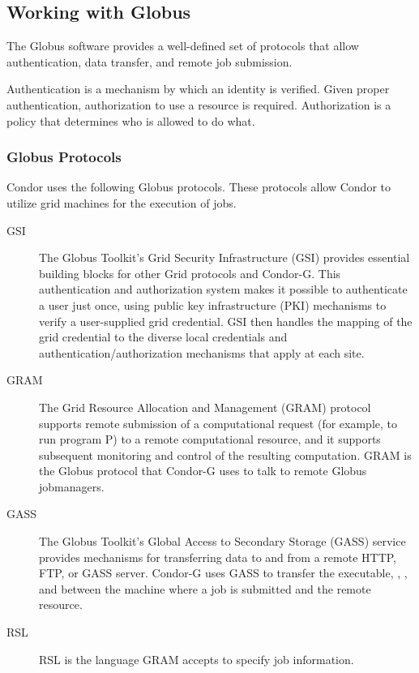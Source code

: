 \subsection{\label{sec:Globus-intro}Working with Globus}

The Globus software provides a well-defined set of protocols
that allow authentication, data transfer, and remote job submission.

Authentication is a mechanism by which an identity is verified.
Given proper authentication, authorization to use a resource
is required.
Authorization is a policy that determines who is allowed to do what. 


\subsubsection{\label{sec:Globus-Protocols}Globus Protocols}
Condor uses the following Globus protocols.
These protocols allow Condor to utilize grid machines for
the execution of jobs.
\begin{description}
\item[GSI]
The Globus Toolkit's Grid Security Infrastructure (GSI) provides essential
building blocks for other Grid protocols and Condor-G.
This authentication and authorization system
makes it possible to authenticate a user just once,
using public key infrastructure (PKI) mechanisms to verify
a user-supplied grid credential.
GSI then handles the mapping of the grid credential to the
diverse local credentials and authentication/authorization mechanisms that
apply at each site. 
\item[GRAM]
The Grid Resource Allocation and Management (GRAM) protocol supports remote
submission of a computational request (for example, to run program P)
to a remote computational resource,
and it supports subsequent monitoring and control of the resulting
computation. 
GRAM is the Globus protocol that Condor-G uses to talk to remote Globus
  jobmanagers.
\item[GASS]
The Globus Toolkit's Global Access to Secondary Storage (GASS) service provides
mechanisms for transferring data to and from a remote HTTP, FTP, or GASS server. 
Condor-G uses GASS to transfer the executable, 
, 
, and 
between the machine where a job is submitted and the remote resource.
\item[RSL]
RSL is the language GRAM accepts to specify job information.
\end{description}

